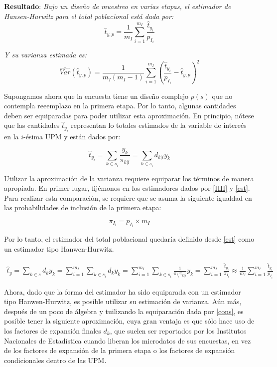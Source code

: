 \documentclass[
  12pt,
  spanish,
]{book}
\begin{document}
\textbf{Resultado}: \emph{Bajo un diseño de muestreo en varias etapas, el estimador de Hansen-Hurwitz para el total poblacional está dada por:}
\begin{equation}
\label{HH}
\hat{t}_{y,p}=\frac{1}{m_I}\sum_{i=1}^{m_I}\frac{\hat{t}_{y_i}}{p_{I_i}}
\end{equation}

\emph{Y su varianza estimada es:}
\begin{equation}
\label{var}
\widehat{Var}(\hat{t}_{y,p})=\frac{1}{m_I(m_I-1)}\sum_{i=1}^{m_I}\left(\frac{\hat{t}_{y_i}}{p_{I_i}}-\hat{t}_{y,p}\right)^2
\end{equation}

Supongamos ahora que la encuesta tiene un diseño complejo \(p(s)\) que no contempla reeemplazo en la primera etapa. Por lo tanto, algunas cantidades deben ser equiparadas para poder utilizar esta aproximación. En principio, nótese que las cantidades \(\hat{t}_{y_i}\) representan lo totales estimados de la variable de intereés en la \(i\)-ésima UPM y están dados por:

\begin{equation}
\hat{t}_{y_i} = \sum_{k \in s_i} \frac{y_k}{\pi_{k|i}}
= \sum_{k \in s_i} d_{k|i} y_k 
\end{equation}

Utilizar la aproximación de la varianza requiere equiparar los términos de manera apropiada. En primer lugar, fijémonos en los estimadores dados por \eqref{HH} y \eqref{est}. Para realizar esta comparación, se requiere que
se asuma la siguiente igualdad en las probabilidades de inclusión de la primera etapa:

\begin{equation}
\label{cons}
\pi_{I_i} = p_{I_i} \times m_I 
\end{equation}

Por lo tanto, el estimador del total poblacional quedaría definido desde \eqref{est} como un estimador tipo Hanwen-Hurwitz.

\begin{align*}
\hat{t}_{y} =\sum_{k\in s} d_k y_k  
= \sum_{i=1}^{m_I}\sum_{k \in s_i} d_k y_k 
= \sum_{i=1}^{m_I}\sum_{k \in s_i} \frac{1}{\pi_{I_i} \pi_{k|i}} y_k 
= \sum_{i=1}^{m_I}\frac{\hat{t}_{y_i}}{\pi_{I_i}} 
\approx \frac{1}{m_I}\sum_{i=1}^{m_I}\frac{\hat{t}_{y_i}}{p_{I_i}}
\end{align*}

Ahora, dado que la forma del estimador ha sido equiparada con un estimador tipo Hanwen-Hurwitz, es posible utilizar su estimación de varianza. Aún más, después de un poco de álgebra y tuilizando la equiparación dada por \eqref{cons}, es posible tener la siguiente aproximación, cuya gran ventaja es que sólo hace uso de los factores de expansión finales \(d_k\), que suelen ser reportados por los Institutos Nacionales de Estadística cuando liberan los microdatos de sus encuestas, en vez de los factores de expansión de la primera etapa o los factores de expansión condicionales dentro de las UPM.
\end{document}
